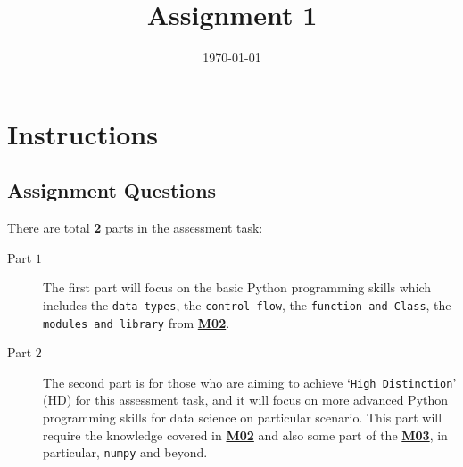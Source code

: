 \documentclass[a4paper]{article}
\date{\today}
\title{Assignment 1}
\begin{document}
    \header{}



    \begin{center}

      \end{center}

      \section*{Instructions}


      \subsection*{Assignment Questions}\label{sec:question}

      There are total \textbf{2} parts in the assessment task:
      \begin{description}
      \item[Part $1$]
      The first part will focus on the basic Python programming skills
      which includes the \texttt{data types}, the \texttt{control flow}, the \texttt{function and Class},
      the \texttt{modules and library} from \href{https://github.com/tulip-lab/sit742/tree/develop/Jupyter/M02-Python}{\textbf{M02}}.

      \item[Part $2$]
      The second part is for those who are aiming to
      achieve `\texttt{High Distinction}' (HD) for this assessment task,
      and it will focus on more advanced Python programming skills for data science on particular scenario.
      This part will require the knowledge covered in \href{https://github.com/tulip-lab/sit742/tree/develop/Jupyter/M02-Python}{\textbf{M02}} and also some part of the \href{https://github.com/tulip-lab/sit742/blob/develop/Jupyter/M03-BigData/M03D-DataAcquisition-I.ipynb}{\textbf{M03}},
      in particular,
      \texttt{numpy} and beyond.
      \end{description}
\end{document}
